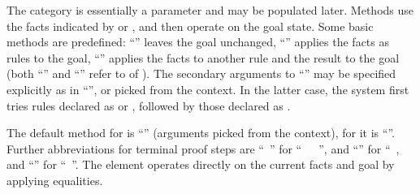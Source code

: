 \begin{isabellebody}
\begin{isamarkuptext}
  \medskip The  category is essentially a parameter
  and may be populated later.  Methods use the facts indicated by
  \hyperlink{command.then}{\mbox{}} or \hyperlink{command.using}{\mbox{}}, and then operate on the
  goal state.  Some basic methods are predefined: ``\hyperlink{method.-}{\mbox{\isa{{\isacharminus}}}}''
  leaves the goal unchanged, ``\hyperlink{method.this}{\mbox{}}'' applies the facts as
  rules to the goal, ``\hyperlink{method.rule}{\mbox{}}'' applies the facts to another
  rule and the result to the goal (both ``\hyperlink{method.this}{\mbox{}}'' and
  ``\hyperlink{method.rule}{\mbox{}}'' refer to \hyperlink{inference.resolution}{\mbox{}} of
  ).  The secondary arguments to
  ``\hyperlink{method.rule}{\mbox{}}'' may be specified explicitly as in ``'', or picked from the context.  In the latter case, the system
  first tries rules declared as \hyperlink{attribute.Pure.elim}{\mbox{}} or
  \hyperlink{attribute.Pure.dest}{\mbox{}}, followed by those declared as \hyperlink{attribute.Pure.intro}{\mbox{}}.

  The default method for \hyperlink{command.proof}{\mbox{}} is ``\hyperlink{method.default}{\mbox{}}''
  (arguments picked from the context), for \hyperlink{command.qed}{\mbox{}} it is
  ``\hyperlink{method.-}{\mbox{\isa{{\isacharminus}}}}''.  Further abbreviations for terminal proof steps
  are ``\hyperlink{command.by}{\mbox{}}~'' for
  ``\hyperlink{command.proof}{\mbox{}}~~\hyperlink{command.qed}{\mbox{}}~'', and ``\hyperlink{command.ddot}{\mbox{\isa{\isacommand{{\isachardot}{\isachardot}}}}}'' for
  ``\hyperlink{command.by}{\mbox{}}~\hyperlink{method.default}{\mbox{}}, and ``\hyperlink{command.dot}{\mbox{\isa{\isacommand{{\isachardot}}}}}'' for
  ``\hyperlink{command.by}{\mbox{}}~\hyperlink{method.this}{\mbox{}}''.  The \hyperlink{command.unfolding}{\mbox{}}
  element operates directly on the current facts and goal by applying
  equalities.


\end{isamarkuptext}
\end{isabellebody}
